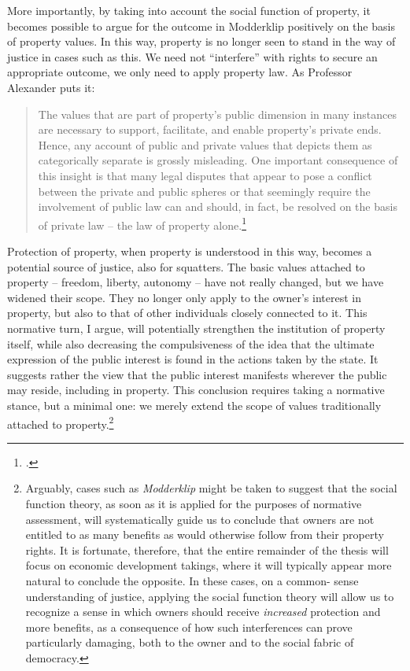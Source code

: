 More importantly, by taking into account the social function of property, it becomes possible to argue for the outcome in Modderklip positively on the basis of property values. In this way, property is no longer seen to stand in the way of justice in cases such as this. We need not ``interfere'' with rights to secure an appropriate outcome, we only need to apply property law. As Professor Alexander puts it: 

\begin{quote} The values that are
part of property's public dimension in many instances are necessary
to support, facilitate, and enable property's private ends.
Hence, any account of public and private values that depicts them as categorically
separate is grossly misleading. One important consequence of this
insight is that many legal disputes that appear to pose a conflict between
the private and public spheres or that seemingly
require the involvement of public law can and
should, in fact, be resolved on the basis of private law -- the law
of property alone.\footcite[1295-1296]{alexander14} \end{quote}

Protection of property, when property is understood in this way, becomes a potential source of justice, also for squatters. The basic values attached to property -- freedom, liberty, autonomy -- have not really changed, but we have widened their scope. They no longer only apply to the owner's interest in property, but also to that of other individuals closely connected to it. This normative turn, I argue, will potentially strengthen the institution of property itself, while also decreasing the compulsiveness of the idea that the ultimate expression of the public interest is found in the actions taken by the state. It suggests rather the view that the public interest manifests wherever the public may reside, including in property. This conclusion requires taking a normative stance, but a minimal one: we merely extend the scope of values traditionally attached to property.\footnote{Arguably, cases such as {\it Modderklip} might be taken to suggest that the social function theory, as soon as it is applied for the purposes of normative assessment, will systematically guide us to conclude that owners are not entitled to as many benefits as would otherwise follow from their property rights. It is fortunate, therefore, that the entire remainder of the thesis will focus on economic development takings, where it will typically appear more natural to conclude the opposite. In these cases, on a common- sense understanding of justice, applying the social function theory will allow us to recognize a sense in which owners should receive {\it increased} protection and more benefits, as a consequence of how such interferences can prove particularly damaging, both to the owner and to the social fabric of democracy.} 

